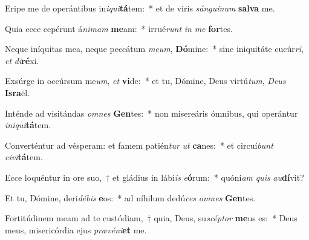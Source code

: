 \item Eripe me de operántibus in\textit{i}\textit{qui}\textbf{tá}tem:~* et de viris \textit{sán}\textit{gui}\textit{num} \textbf{sal}\textbf{va} me.
\item Quia ecce cepérunt á\textit{ni}\textit{mam} \textbf{me}am:~* irrué\textit{runt} \textit{in} \textit{me} \textbf{for}tes.
\item Neque iníquitas mea, neque peccátum \textit{me}\textit{um}, \textbf{Dó}mine:~* sine iniquitáte cucúr\textit{ri}, \textit{et} \textit{di}\textbf{ré}xi.
\item Exsúrge in occúrsum me\textit{um}, \textit{et} \textbf{vi}de:~* et tu, Dómine, Deus virtú\textit{tum}, \textit{De}\textit{us} \textbf{Is}\textbf{ra}ël.
\item Inténde ad visitándas \textit{om}\textit{nes} \textbf{Gen}tes:~* non misereáris ómnibus, qui operántur \textit{in}\textit{i}\textit{qui}\textbf{tá}tem.
\item Converténtur ad vésperam: et famem patién\textit{tur} \textit{ut} \textbf{ca}nes:~* et circuí\textit{bunt} \textit{ci}\textit{vi}\textbf{tá}tem.
\item Ecce loquéntur in ore suo,~† et gládius in lábi\textit{is} \textit{e}\textbf{ó}rum:~* quóni\textit{am} \textit{quis} \textit{au}\textbf{dí}vit?
\item Et tu, Dómine, deri\textit{dé}\textit{bis} \textbf{e}os:~* ad níhilum dedú\textit{ces} \textit{om}\textit{nes} \textbf{Gen}tes.
\item Fortitúdinem meam ad te custódiam,~† quia, Deus, su\textit{scép}\textit{tor} \textbf{me}us es:~* Deus meus, misericórdia ejus \textit{præ}\textit{vé}\textit{ni}\textbf{et} me.
